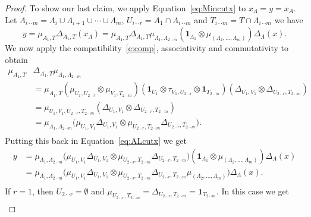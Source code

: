 \documentclass[ALCO,ThmDefs,Unicode,epreuves]{cedram}
\def\Id{\mathbf{1}}
\begin{document}
\begin{proof}
To show our last claim, we apply Equation~\eqref{eq:Mincutx} to $x_\Lambda=y=x_A$. Let $\Lambda_{i\cdot\cdot m}=\Lambda_i\cup\Lambda_{i+1}\cup\cdots\cup \Lambda_m$,
$U_{i\cdot\cdot r}= A_1\cap \Lambda_{i\cdot\cdot m}$ and $T_{i\cdot\cdot m}= T\cap \Lambda_{i\cdot\cdot m}$ we have
\begin{equation}\label{eq:ALcutx}
 y=\mu_{A_1,T}\Delta_{A_1,T}(x_\Lambda)=\mu_{A_1,T}\Delta_{A_1,T}\mu_{\Lambda_1,\Lambda_{2\cdot\cdot m}}(\Id_{\Lambda_1}\otimes \mu_{(\Lambda_2,\ldots,\Lambda_m)})\Delta_\Lambda(x).
 \end{equation}
We now apply the compatibility~\eqref{e:comp}, associativity and commutativity to obtain
$$ \begin{aligned}
 \mu_{A_1,T}&\Delta_{A_1,T}\mu_{\Lambda_1,\Lambda_{2\cdot\cdot m}} \\ %
 &= \mu_{A_1,T}(\mu_{U_1,U_{2\cdot\cdot r}}\otimes \mu_{V_1,T_{2\cdot\cdot m}})(\Id_{U_1}\otimes\tau_{V_1,U_{2\cdot\cdot r}}\otimes \Id_{T_{2\cdot\cdot m}})
 (\Delta_{U_1,V_1}\otimes \Delta_{U_{2\cdot\cdot r},T_{2\cdot\cdot m}})\\
 &= \mu_{U_1,V_1,U_{2\cdot\cdot r},T_{2\cdot\cdot m}} (\Delta_{U_1,V_1}\otimes \Delta_{U_{2\cdot\cdot r},T_{2\cdot\cdot m}})\\
 &= \mu_{\Lambda_1,\Lambda_{2\cdot\cdot m}} \big( \mu_{U_1,V_1} \Delta_{U_1,V_1}\otimes \mu_{U_{2\cdot\cdot r},T_{2\cdot\cdot m}}\Delta_{U_{2\cdot\cdot r},T_{2\cdot\cdot m}}\big).\\
 \end{aligned}$$
Putting this back in Equation~\eqref{eq:ALcutx} we get
 $$\begin{aligned}
 y&=\mu_{\Lambda_1,\Lambda_{2\cdot\cdot m}} \big( \mu_{U_1,V_1} \Delta_{U_1,V_1}\otimes \mu_{U_{2\cdot\cdot r},T_{2\cdot\cdot m}}\Delta_{U_{2\cdot\cdot r},T_{2\cdot\cdot m}}\big)(\Id_{\Lambda_1}\otimes \mu_{(\Lambda_2,\ldots,\Lambda_m)})\Delta_\Lambda(x)\\
 &=\mu_{\Lambda_1,\Lambda_{2\cdot\cdot m}} \big( \mu_{U_1,V_1} \Delta_{U_1,V_1}\otimes \mu_{U_{2\cdot\cdot r},T_{2\cdot\cdot m}}\Delta_{U_{2\cdot\cdot r},T_{2\cdot\cdot m}} \mu_{(\Lambda_2,\ldots,\Lambda_m)}\big)\Delta_\Lambda(x).\\
 \end{aligned}
 $$
 If $r=1$, then $U_{2\cdot\cdot r}=\emptyset$ and $\mu_{U_{2\cdot\cdot r},T_{2\cdot\cdot m}}=\Delta_{U_{2\cdot\cdot r},T_{2\cdot\cdot m}}=\Id_{T_{2\cdot\cdot m}}$.
 In this case we get
 $$ \begin{aligned}

\end{aligned}$$
\end{proof}
\end{document}
